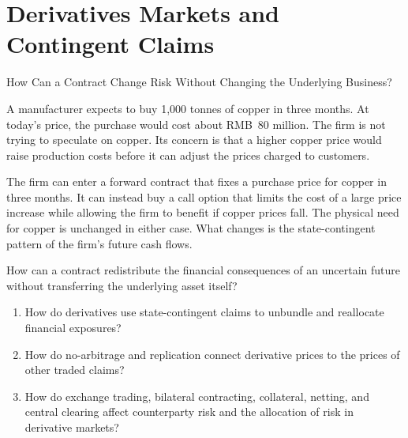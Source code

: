 \chapter{Derivatives Markets and Contingent Claims}
\label{chap:Derivatives_Markets_and_Contingent_Claims}

\begin{openingcase}{How Can a Contract Change Risk Without Changing the Underlying Business?}

A manufacturer expects to buy 1,000 tonnes of copper in three months. At today's price, the purchase would cost about RMB~80 million. The firm is not trying to speculate on copper. Its concern is that a higher copper price would raise production costs before it can adjust the prices charged to customers.

The firm can enter a forward contract that fixes a purchase price for copper in three months. It can instead buy a call option that limits the cost of a large price increase while allowing the firm to benefit if copper prices fall. The physical need for copper is unchanged in either case. What changes is the state-contingent pattern of the firm's future cash flows.

How can a contract redistribute the financial consequences of an uncertain future without transferring the underlying asset itself?

\end{openingcase}



\begin{tcolorbox}[
  enhanced,
  colback=FinanceBlue!6,
  colframe=FinanceBlue,
  boxrule=0.6pt,
  sharp corners,
  left=8pt,
  right=8pt,
  top=7pt,
  bottom=7pt,
  before skip=1em,
  after skip=1.6em,
  title=\textbf{Core Questions},
  coltitle=white,
  colbacktitle=FinanceBlue,
  fonttitle=\bfseries,
  attach boxed title to top left={xshift=6pt,yshift=-2mm},
  boxed title style={
    boxrule=0pt,
    sharp corners,
    left=5pt,
    right=5pt,
    top=2pt,
    bottom=2pt
  }
]
\begin{enumerate}[
  leftmargin=*,
  label=\textcolor{FinanceBlue}{\textbf{\arabic*.}},
  itemsep=0.55em,
  topsep=0.2em
]


\item How do derivatives use state-contingent claims to unbundle and reallocate financial exposures?

\item How do no-arbitrage and replication connect derivative prices to the prices of other traded claims?

\item How do exchange trading, bilateral contracting, collateral, netting, and central clearing affect counterparty risk and the allocation of risk in derivative markets?


\end{enumerate}
\end{tcolorbox}

